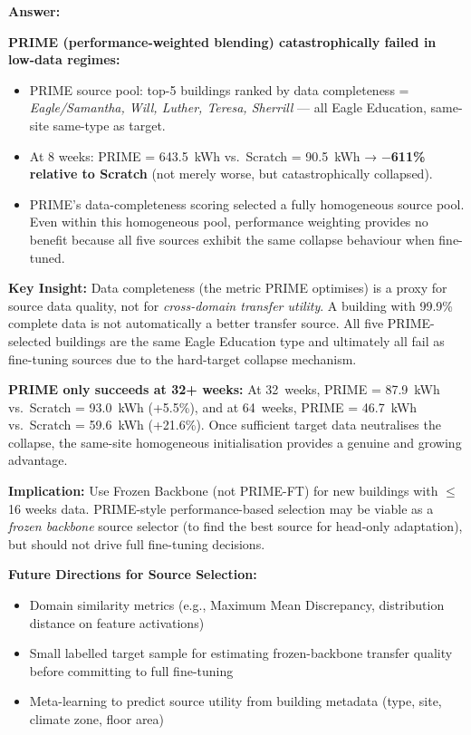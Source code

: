 \documentclass[12pt,a4paper]{report}
\begin{document}
\textbf{Answer:}

\textbf{PRIME (performance-weighted blending) catastrophically failed in low-data regimes:}

\begin{itemize}
    \item PRIME source pool: top-5 buildings ranked by data completeness = \textit{Eagle/Samantha, Will, Luther, Teresa, Sherrill} --- all Eagle Education, same-site same-type as target.
    \item At 8 weeks: PRIME = 643.5~kWh vs.\ Scratch = 90.5~kWh → \textbf{$-$611\% relative to Scratch} (not merely worse, but catastrophically collapsed).
    \item PRIME's data-completeness scoring selected a fully homogeneous source pool. Even within this homogeneous pool, performance weighting provides no benefit because all five sources exhibit the same collapse behaviour when fine-tuned.
\end{itemize}

\textbf{Key Insight:} Data completeness (the metric PRIME optimises) is a proxy for source data quality, not for \textit{cross-domain transfer utility}. A building with 99.9\% complete data is not automatically a better transfer source. All five PRIME-selected buildings are the same Eagle Education type and ultimately all fail as fine-tuning sources due to the hard-target collapse mechanism.

\textbf{PRIME only succeeds at 32+ weeks:} At 32~weeks, PRIME = 87.9~kWh vs.\ Scratch = 93.0~kWh (+5.5\%), and at 64~weeks, PRIME = 46.7~kWh vs.\ Scratch = 59.6~kWh (+21.6\%). Once sufficient target data neutralises the collapse, the same-site homogeneous initialisation provides a genuine and growing advantage.

\textbf{Implication:} Use Frozen Backbone (not PRIME-FT) for new buildings with $\leq$16 weeks data. PRIME-style performance-based selection may be viable as a \textit{frozen backbone} source selector (to find the best source for head-only adaptation), but should not drive full fine-tuning decisions.

\textbf{Future Directions for Source Selection:}
\begin{itemize}
    \item Domain similarity metrics (e.g., Maximum Mean Discrepancy, distribution distance on feature activations)
    \item Small labelled target sample for estimating frozen-backbone transfer quality before committing to full fine-tuning
    \item Meta-learning to predict source utility from building metadata (type, site, climate zone, floor area)
\end{itemize}
\end{document}
